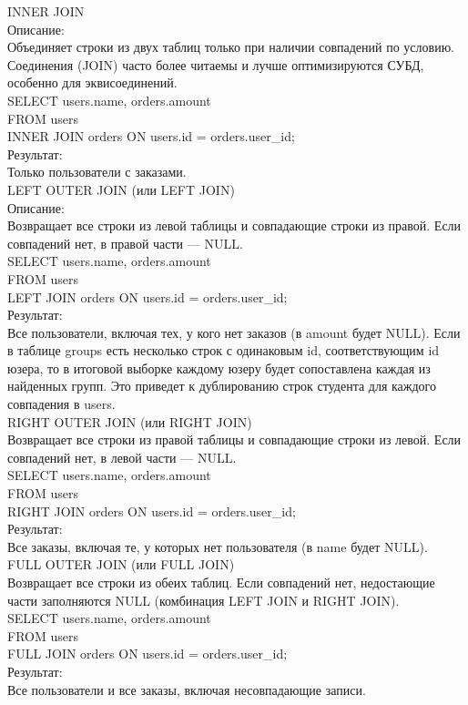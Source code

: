 \noindent INNER JOIN \\
Описание: \\
Объединяет строки из двух таблиц только при наличии совпадений по условию. Соединения (JOIN) часто более читаемы и лучше оптимизируются СУБД, особенно для эквисоединений. \\
SELECT users.name, orders.amount \\
FROM users \\
INNER JOIN orders ON users.id = orders.user\_id; \\
Результат: \\
Только пользователи с заказами. \\

\noindent LEFT OUTER JOIN (или LEFT JOIN) \\
Описание: \\
Возвращает все строки из левой таблицы и совпадающие строки из правой. Если совпадений нет, в правой части — NULL. \\
SELECT users.name, orders.amount \\
FROM users \\
LEFT JOIN orders ON users.id = orders.user\_id; \\
Результат: \\
Все пользователи, включая тех, у кого нет заказов (в amount будет NULL). Если в таблице groups есть несколько строк с одинаковым id, соответствующим id юзера, то в итоговой выборке каждому юзеру будет сопоставлена каждая из найденных групп. Это приведет к дублированию строк студента для каждого совпадения в users.\\ 

\noindent RIGHT OUTER JOIN (или RIGHT JOIN) \\
Возвращает все строки из правой таблицы и совпадающие строки из левой. Если совпадений нет, в левой части — NULL. \\
SELECT users.name, orders.amount \\
FROM users \\
RIGHT JOIN orders ON users.id = orders.user\_id; \\
Результат: \\
Все заказы, включая те, у которых нет пользователя (в name будет NULL). \\ 

\noindent FULL OUTER JOIN (или FULL JOIN) \\
Возвращает все строки из обеих таблиц. Если совпадений нет, недостающие части заполняются NULL (комбинация LEFT JOIN и RIGHT JOIN). \\
SELECT users.name, orders.amount \\
FROM users \\
FULL JOIN orders ON users.id = orders.user\_id; \\ 
Результат: \\
Все пользователи и все заказы, включая несовпадающие записи. \\


